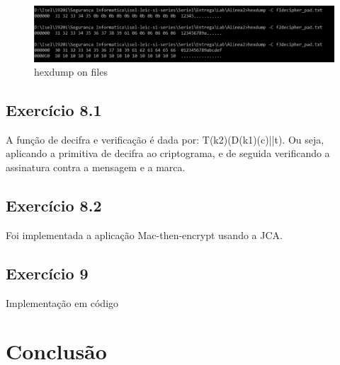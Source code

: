 \documentclass[11pt]{report}
\begin{document}
\begin{figure}[H]
	\centering
	\includegraphics[scale=0.5]{img/padding}
	\caption{hexdump on files}
\end{figure}

\subsection{Exercício 8.1}
A função de decifra e verificação é dada por: T(k2)(D(k1)(c)||t). Ou seja, aplicando a primitiva de decifra ao criptograma, e de seguida verificando a assinatura contra a mensagem e a marca.\\

\subsection{Exercício 8.2}
Foi implementada a aplicação Mac-then-encrypt usando a JCA.\\

\subsection{Exercício 9}
Implementação em código \\
\newpage



\section{Conclusão}
\end{document}
